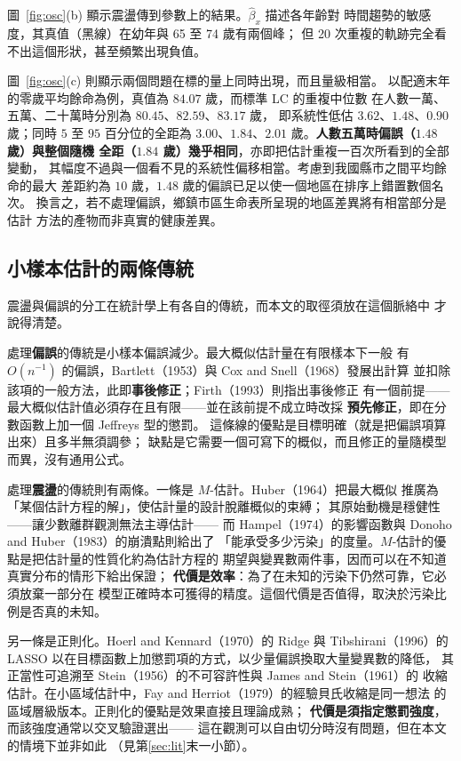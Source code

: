 \documentclass[UTF8, fontset=macnew, a4paper, 12pt]{ctexart}
\begin{document}
圖~\ref{fig:osc}(b) 顯示震盪傳到參數上的結果。$\hat\beta_x$ 描述各年齡對
時間趨勢的敏感度，其真值（黑線）在幼年與 65 至 74 歲有兩個峰；
但 20 次重複的軌跡完全看不出這個形狀，甚至頻繁出現負值。

圖~\ref{fig:osc}(c) 則顯示兩個問題在標的量上同時出現，而且量級相當。
以配適末年的零歲平均餘命為例，真值為 $84.07$ 歲，而標準 LC 的重複中位數
在人數一萬、五萬、二十萬時分別為 $80.45$、$82.59$、$83.17$ 歲，
即系統性低估 $3.62$、$1.48$、$0.90$ 歲；同時 $5$ 至 $95$ 百分位的全距為
$3.00$、$1.84$、$2.01$ 歲。\textbf{人數五萬時偏誤（$1.48$ 歲）與整個隨機
全距（$1.84$ 歲）幾乎相同}，亦即把估計重複一百次所看到的全部變動，
其幅度不過與一個看不見的系統性偏移相當。考慮到我國縣市之間平均餘命的最大
差距約為 $10$ 歲，$1.48$ 歲的偏誤已足以使一個地區在排序上錯置數個名次。
換言之，若不處理偏誤，鄉鎮市區生命表所呈現的地區差異將有相當部分是估計
方法的產物而非真實的健康差異。

\subsection{小樣本估計的兩條傳統}

震盪與偏誤的分工在統計學上有各自的傳統，而本文的取徑須放在這個脈絡中
才說得清楚。

處理\textbf{偏誤}的傳統是小樣本偏誤減少。最大概似估計量在有限樣本下一般
有 $O(n^{-1})$ 的偏誤，Bartlett（1953）與 Cox and Snell（1968）發展出計算
並扣除該項的一般方法，此即\textbf{事後修正}；Firth（1993）則指出事後修正
有一個前提——最大概似估計值必須存在且有限——並在該前提不成立時改採
\textbf{預先修正}，即在分數函數上加一個 Jeffreys 型的懲罰。
這條線的優點是目標明確（就是把偏誤項算出來）且多半無須調參；
缺點是它需要一個可寫下的概似，而且修正的量隨模型而異，沒有通用公式。

處理\textbf{震盪}的傳統則有兩條。一條是 $M$-估計。Huber（1964）把最大概似
推廣為「某個估計方程的解」，使估計量的設計脫離概似的束縛；
其原始動機是穩健性——讓少數離群觀測無法主導估計——
而 Hampel（1974）的影響函數與 Donoho and Huber（1983）的崩潰點則給出了
「能承受多少污染」的度量。$M$-估計的優點是把估計量的性質化約為估計方程的
期望與變異數兩件事，因而可以在不知道真實分布的情形下給出保證；
\textbf{代價是效率}：為了在未知的污染下仍然可靠，它必須放棄一部分在
模型正確時本可獲得的精度。這個代價是否值得，取決於污染比例是否真的未知。

另一條是正則化。Hoerl and Kennard（1970）的 Ridge 與 Tibshirani（1996）的
LASSO 以在目標函數上加懲罰項的方式，以少量偏誤換取大量變異數的降低，
其正當性可追溯至 Stein（1956）的不可容許性與 James and Stein（1961）的
收縮估計。在小區域估計中，Fay and Herriot（1979）的經驗貝氏收縮是同一想法
的區域層級版本。正則化的優點是效果直接且理論成熟；
\textbf{代價是須指定懲罰強度}，而該強度通常以交叉驗證選出——
這在觀測可以自由切分時沒有問題，但在本文的情境下並非如此
（見第\ref{sec:lit}末一小節）。
\end{document}
